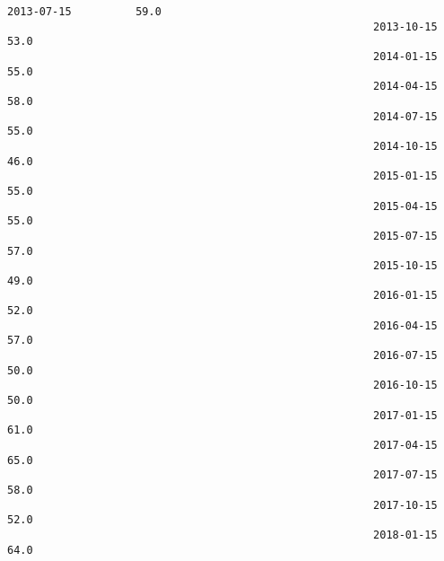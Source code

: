 \documentclass[11pt]{article}
\begin{document}
\begin{Verbatim}[commandchars=\\\{\}]
                                                         2013-07-15          59.0   
                                                         2013-10-15          53.0   
                                                         2014-01-15          55.0   
                                                         2014-04-15          58.0   
                                                         2014-07-15          55.0   
                                                         2014-10-15          46.0   
                                                         2015-01-15          55.0   
                                                         2015-04-15          55.0   
                                                         2015-07-15          57.0   
                                                         2015-10-15          49.0   
                                                         2016-01-15          52.0   
                                                         2016-04-15          57.0   
                                                         2016-07-15          50.0   
                                                         2016-10-15          50.0   
                                                         2017-01-15          61.0   
                                                         2017-04-15          65.0   
                                                         2017-07-15          58.0   
                                                         2017-10-15          52.0   
                                                         2018-01-15          64.0   
        

\end{Verbatim}
\end{document}

